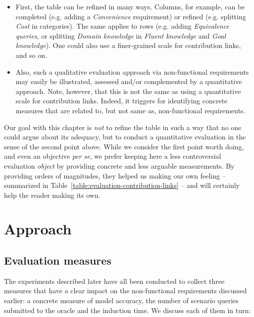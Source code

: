\begin{itemize}

\item First, the table can be refined in many ways. Columns, for example, can be completed (e.g. adding a \emph{Convenience} requirement) or refined (e.g. splitting \emph{Cost} in categories). The same applies to rows (e.g. adding \emph{Equivalence queries}, or splitting \emph{Domain knowledge} in \emph{Fluent knowledge} and \emph{Goal knowledge}). One could also use a finer-grained scale for contribution links, and so on.

\item Also, such a qualitative evaluation approach via non-functional requirements may easily be illustrated, assessed and/or complemented by a quantitative approach. Note, however, that this is not the same as using a quantitative scale for contribution links. Indeed, it triggers for identifying concrete measures that are related to, but not same as, non-functional requirements.  

\end{itemize}

Our goal with this chapter is \emph{not} to refine the table in such a way that no one could argue about its adequacy, but to conduct a quantitative evaluation in the sense of the second point above. While we consider the first point worth doing, and even an objective \emph{per se}, we prefer keeping here a less controversial evaluation \emph{object} by providing concrete and less arguable measurements. By providing orders of magnitudes, they helped us making our own feeling -- summarized in Table~\ref{table:evaluation-contribution-links} -- and will certainly help the reader making its own.

\section{Approach\label{section:evaluation-approach}}

\subsection{Evaluation measures}

The experiments described later have all been conducted to collect three measures that have a clear impact on the non-functional requirements discussed earlier: a concrete measure of model accuracy, the number of scenario queries submitted to the oracle and the induction time. We discuss each of them in turn:

